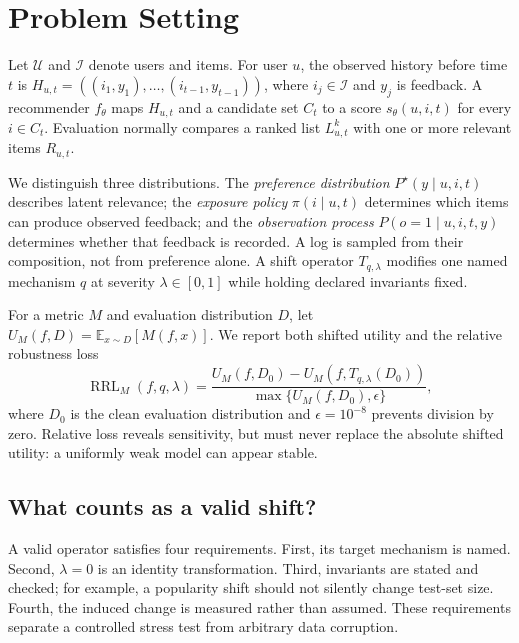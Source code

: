 \section{Problem Setting}
\label{sec:setting}

Let $\mathcal{U}$ and $\mathcal{I}$ denote users and items.  For user $u$, the
observed history before time $t$ is
$H_{u,t}=((i_1,y_1),\ldots,(i_{t-1},y_{t-1}))$, where $i_j\in\mathcal{I}$ and
$y_j$ is feedback.  A recommender $f_\theta$ maps $H_{u,t}$ and a candidate set
$C_t$ to a score $s_\theta(u,i,t)$ for every $i\in C_t$.  Evaluation normally
compares a ranked list $L_{u,t}^k$ with one or more relevant items $R_{u,t}$.

We distinguish three distributions.  The \emph{preference distribution}
$P^\star(y\mid u,i,t)$ describes latent relevance; the \emph{exposure policy}
$\pi(i\mid u,t)$ determines which items can produce observed feedback; and the
\emph{observation process} $P(o=1\mid u,i,t,y)$ determines whether that feedback
is recorded.  A log is sampled from their composition, not from preference
alone.  A shift operator $T_{q,\lambda}$ modifies one named mechanism $q$ at
severity $\lambda\in[0,1]$ while holding declared invariants fixed.

For a metric $M$ and evaluation distribution $D$, let
$U_M(f,D)=\mathbb{E}_{x\sim D}[M(f,x)]$.  We report both shifted utility and the
relative robustness loss
\begin{equation}
  \operatorname{RRL}_{M}(f,q,\lambda)
  =\frac{U_M(f,D_0)-U_M(f,T_{q,\lambda}(D_0))}
  {\max\{U_M(f,D_0),\epsilon\}},
  \label{eq:rrl}
\end{equation}
where $D_0$ is the clean evaluation distribution and $\epsilon=10^{-8}$ prevents
division by zero.  Relative loss reveals sensitivity, but must never replace the
absolute shifted utility: a uniformly weak model can appear stable.

\subsection{What counts as a valid shift?}

A valid operator satisfies four requirements.  First, its target mechanism is
named.  Second, $\lambda=0$ is an identity transformation.  Third, invariants
are stated and checked; for example, a popularity shift should not silently
change test-set size.  Fourth, the induced change is measured rather than
assumed.  These requirements separate a controlled stress test from arbitrary
data corruption.

